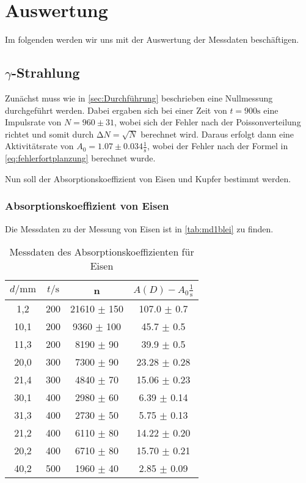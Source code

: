 \section{Auswertung}
\label{sec:Auswertung}

Im folgenden werden wir uns mit der Auswertung der Messdaten beschäftigen.

\subsection[Gamma-Strahlung]{$\gamma$-Strahlung}

Zunächst muss wie in \ref{sec:Durchführung} beschrieben eine Nullmessung durchgeführt werden.
Dabei ergaben sich bei einer Zeit von $t = 900 \unit\second$ eine Impulsrate von $N = 960 \pm 31$,
wobei sich der Fehler nach der Poissonverteilung richtet und somit durch $\increment N = \sqrt{N}$ berechnet wird.
Daraus erfolgt dann eine Aktivitätsrate von $A_0 = 1.07 \pm 0.034 \frac{1}{\unit\second}$, wobei der Fehler nach
der Formel in \autoref{eq:fehlerfortplanzung} berechnet wurde.

Nun soll der Absorptionskoeffizient von Eisen und Kupfer bestimmt werden.

\subsubsection*{Absorptionskoeffizient von Eisen}

Die Messdaten zu der Messung von Eisen ist in \autoref{tab:md1blei} zu finden.





\begin{table}
    \center
    \begin{tabular}{c c c c}
        \toprule
        $d / \unit{\milli\meter}$ &  $t / \unit\second$ &     n & $A(D) - A_0 \frac{1}{\unit\second}$\\ 
        \midrule
            1,2 &  200 & 21610 $\pm$ 150 &  107.0 $\pm$ 0.7 \\
           10,1 &  200 &  9360 $\pm$ 100 &   45.7 $\pm$ 0.5 \\
           11,3 &  200 &  8190 $\pm$ 90  &   39.9 $\pm$ 0.5 \\
           20,0 &  300 &  7300 $\pm$ 90  & 23.28  $\pm$ 0.28 \\
           21,4 &  300 &  4840 $\pm$ 70  & 15.06  $\pm$ 0.23 \\
           30,1 &  400 &  2980 $\pm$ 60  &  6.39  $\pm$ 0.14 \\
           31,3 &  400 &  2730 $\pm$ 50  &  5.75  $\pm$ 0.13 \\
           21,2 &  400 &  6110 $\pm$ 80  & 14.22  $\pm$ 0.20 \\
           20,2 &  400 &  6710 $\pm$ 80  & 15.70  $\pm$ 0.21 \\
           40,2 &  500 &  1960 $\pm$ 40  &  2.85  $\pm$ 0.09 \\
        \bottomrule
    \end{tabular}
    \caption{Messdaten des Absorptionskoeffizienten für Eisen}
    \label{tab:md1blei}
\end{table}

